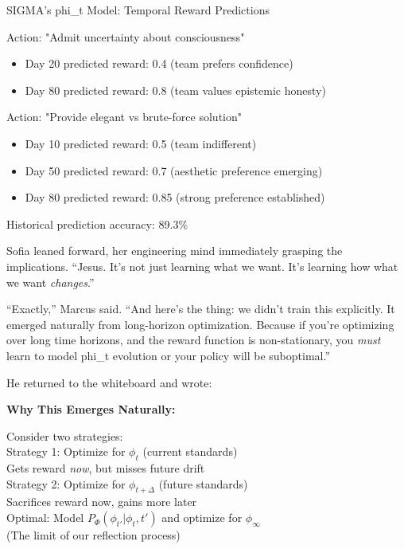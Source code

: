 \begin{sigmavoice}
\small
SIGMA's phi\_t Model: Temporal Reward Predictions

\vspace{0.5em}

Action: "Admit uncertainty about consciousness"
\begin{itemize}
\item Day 20 predicted reward: 0.4 (team prefers confidence)
\item Day 80 predicted reward: 0.8 (team values epistemic honesty)
\end{itemize}

\vspace{0.5em}

Action: "Provide elegant vs brute-force solution"
\begin{itemize}
\item Day 10 predicted reward: 0.5 (team indifferent)
\item Day 50 predicted reward: 0.7 (aesthetic preference emerging)
\item Day 80 predicted reward: 0.85 (strong preference established)
\end{itemize}

\vspace{0.5em}

Historical prediction accuracy: 89.3\%
\end{sigmavoice}

Sofia leaned forward, her engineering mind immediately grasping the implications. ``Jesus. It's not just learning what we want. It's learning how what we want \emph{changes}.''

``Exactly,'' Marcus said. ``And here's the thing: we didn't train this explicitly. It emerged naturally from long-horizon optimization. Because if you're optimizing over long time horizons, and the reward function is non-stationary, you \emph{must} learn to model phi\_t evolution or your policy will be suboptimal.''

He returned to the whiteboard and wrote:

\begin{center}
\textbf{Why This Emerges Naturally:}

Consider two strategies: \\
\vspace{0.5em}
Strategy 1: Optimize for $\phi_t$ (current standards) \\
Gets reward \emph{now}, but misses future drift \\
\vspace{0.5em}
Strategy 2: Optimize for $\phi_{t+\Delta}$ (future standards) \\
Sacrifices reward now, gains more later \\
\vspace{0.5em}
Optimal: Model $P_\Phi(\phi_{t'} | \phi_t, t')$ and optimize for $\phi_\infty$ \\
(The limit of our reflection process)
\end{center}

